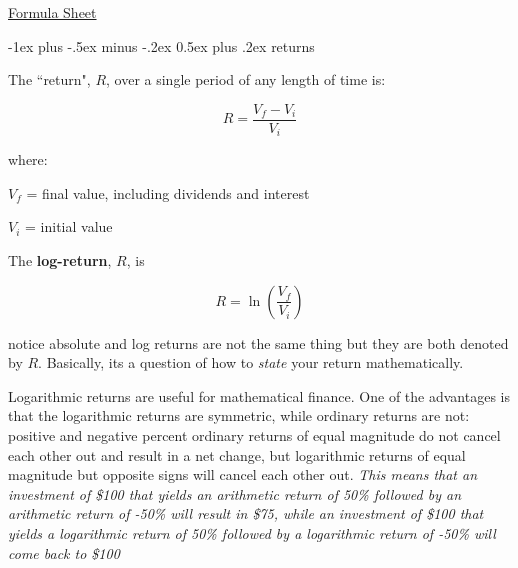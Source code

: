 \documentclass[10pt,landscape]{article}
\makeatletter
\renewcommand{\section}{\@startsection{section}{1}{0mm}%
                                {-1ex plus -.5ex minus -.2ex}%
                                {0.5ex plus .2ex}%
                                {\normalfont\large\bfseries}}
\makeatother
\begin{document}
\raggedright
\footnotesize
\begin{multicols}{3}


\setlength{\premulticols}{1pt}
\setlength{\postmulticols}{1pt}
\setlength{\multicolsep}{1pt}
\setlength{\columnsep}{2pt}

\begin{center}
     \Large{\underline{Formula Sheet}} \\
\end{center}

\section{returns}

\vspace{0.25cm}

The ``return", $R$, over a single period of any length of time is:

\vspace{0.25cm}

$$R=\frac{V_f - V_i}{V_i}$$

\vspace{0.25cm}

where:

\vspace{0.25cm}

$V_f$ = final value, including dividends and interest

$V_i$ = initial value

\vspace{0.25cm}

The \textbf{log-return}, $R$, is

$$R  = \ln\left(\frac{V_f}{V_i}\right)$$

\vspace{0.25cm}

notice absolute and log returns are not the same thing but they are both denoted by $R$. Basically, its a question of how to \textit{state} your return mathematically.

Logarithmic returns are useful for mathematical finance. One of the advantages is that the logarithmic returns are symmetric, while ordinary returns are not: positive and negative percent ordinary returns of equal magnitude do not cancel each other out and result in a net change, but logarithmic returns of equal magnitude but opposite signs will cancel each other out. \textit{This means that an investment of \$100 that yields an arithmetic return of 50\% followed by an arithmetic return of -50\% will result in \$75, while an investment of \$100 that yields a logarithmic return of 50\% followed by a logarithmic return of -50\% will come back to \$100}


\end{multicols}
\end{document}
